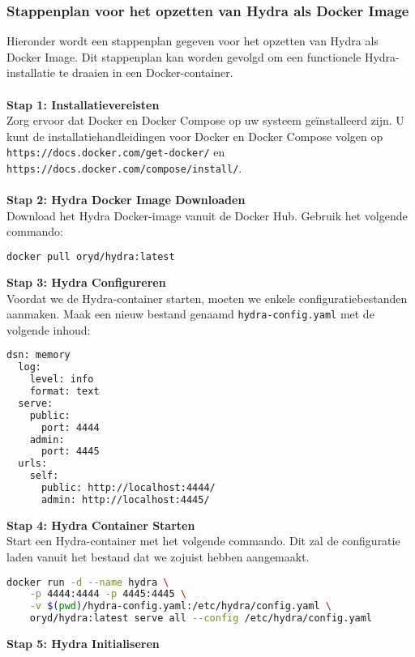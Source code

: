 \subsubsection{Stappenplan voor het opzetten van Hydra als Docker Image}%
\label{subsubsec:hydra-setup}
Hieronder wordt een stappenplan gegeven voor het opzetten van Hydra als Docker Image. Dit stappenplan kan worden gevolgd om een functionele Hydra-installatie te draaien in een Docker-container.\\\\
\textbf{Stap 1: Installatievereisten}\\
Zorg ervoor dat Docker en Docker Compose op uw systeem geïnstalleerd zijn. U kunt de installatiehandleidingen voor Docker en Docker Compose volgen op\\ \texttt{https://docs.docker.com/get-docker/} en \texttt{https://docs.docker.com/compose/install/}.\\\\
\textbf{Stap 2: Hydra Docker Image Downloaden}\\
Download het Hydra Docker-image vanuit de Docker Hub. Gebruik het volgende commando:
\begin{lstlisting}[language=bash, caption=Hydra Docker Image downloaden]
  docker pull oryd/hydra:latest
\end{lstlisting}
\textbf{Stap 3: Hydra Configureren}\\
Voordat we de Hydra-container starten, moeten we enkele configuratiebestanden aanmaken. Maak een nieuw bestand genaamd \texttt{hydra-config.yaml} met de volgende inhoud:
\begin{lstlisting}[language=bash, caption=Hydra Configuratie]
  dsn: memory
  log:
    level: info
    format: text
  serve:
    public:
      port: 4444
    admin:
      port: 4445
  urls:
    self:
      public: http://localhost:4444/
      admin: http://localhost:4445/
\end{lstlisting}
\textbf{Stap 4: Hydra Container Starten}\\
Start een Hydra-container met het volgende commando. Dit zal de configuratie laden vanuit het bestand dat we zojuist hebben aangemaakt.
\begin{lstlisting}[language=bash, caption=Hydra Docker Image starten]
docker run -d --name hydra \
    -p 4444:4444 -p 4445:4445 \
    -v $(pwd)/hydra-config.yaml:/etc/hydra/config.yaml \
    oryd/hydra:latest serve all --config /etc/hydra/config.yaml
\end{lstlisting}
\textbf{Stap 5: Hydra Initialiseren}\\

